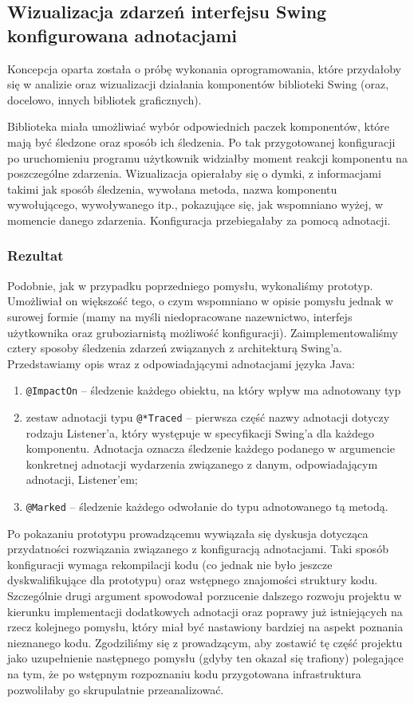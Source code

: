 \documentclass[12pt,a4paper,titlepage]{article}
\begin{document}
 \subsection{Wizualizacja zdarzeń interfejsu Swing konfigurowana adnotacjami}
 Koncepcja oparta została o próbę wykonania oprogramowania, które przydałoby się w analizie oraz wizualizacji działania komponentów biblioteki Swing (oraz, docelowo, innych bibliotek graficznych).
 
 Biblioteka miała umożliwiać wybór odpowiednich paczek komponentów, które mają być śledzone oraz sposób ich śledzenia. Po tak przygotowanej konfiguracji po uruchomieniu programu użytkownik widziałby moment reakcji komponentu na poszczególne zdarzenia. Wizualizacja opierałaby się o dymki, z informacjami takimi jak sposób śledzenia, wywołana metoda, nazwa komponentu wywołującego, wywoływanego itp., pokazujące się, jak wspomniano wyżej, w momencie danego zdarzenia. Konfiguracja przebiegałaby za pomocą adnotacji.
 
 \subsubsection*{Rezultat}
  Podobnie, jak w przypadku poprzedniego pomysłu, wykonaliśmy prototyp. Umożliwiał on większość tego, o czym wspomniano w opisie pomysłu jednak w surowej formie (mamy na myśli niedopracowane nazewnictwo, interfejs użytkownika oraz gruboziarnistą możliwość konfiguracji). Zaimplementowaliśmy cztery sposoby śledzenia zdarzeń związanych z architekturą Swing'a. Przedstawiamy opis wraz z odpowiadającymi adnotacjami języka Java:
  \begin{enumerate}
   \item \texttt{@ImpactOn} -- śledzenie każdego obiektu, na który wpływ ma adnotowany typ 
   \item zestaw adnotacji typu \texttt{@*Traced} -- pierwsza część nazwy adnotacji dotyczy rodzaju Listener'a, który występuje w specyfikacji Swing'a dla każdego komponentu. Adnotacja oznacza śledzenie każdego podanego w argumencie konkretnej adnotacji wydarzenia związanego z danym, odpowiadającym adnotacji, Listener'em;
   \item \texttt{@Marked} -- śledzenie każdego odwołanie do typu adnotowanego tą metodą.
  \end{enumerate}
  
  Po pokazaniu prototypu prowadzącemu wywiązała się dyskusja dotycząca przydatności rozwiązania związanego z konfiguracją adnotacjami. Taki sposób konfiguracji wymaga rekompilacji kodu (co jednak nie było jeszcze dyskwalifikujące dla prototypu) oraz wstępnego znajomości struktury kodu. Szczególnie drugi argument spowodował porzucenie dalszego rozwoju projektu w kierunku implementacji dodatkowych adnotacji oraz poprawy już istniejących na rzecz kolejnego pomysłu, który miał być nastawiony bardziej na aspekt poznania nieznanego kodu. Zgodziliśmy się z prowadzącym, aby zostawić tę część projektu jako uzupełnienie następnego pomysłu (gdyby ten okazał się trafiony) polegające na tym, że po wstępnym rozpoznaniu kodu przygotowana infrastruktura pozwoliłaby go skrupulatnie przeanalizować.
  
\end{document}
